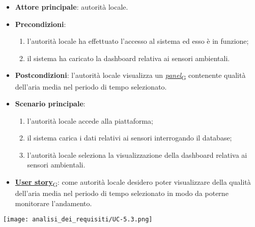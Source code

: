 \begin{itemize}
	\item \textbf{Attore principale}: autorità locale.
	\item \textbf{Precondizioni}:
	      \begin{enumerate}
		      \item l'autorità locale ha effettuato l'accesso al sistema ed esso è in funzione;
		      \item il sistema ha caricato la dashboard relativa ai sensori ambientali.
	      \end{enumerate}
	\item \textbf{Postcondizioni}: l'autorità locale visualizza un \href{https://7last.github.io/docs/rtb/documentazione-interna/glossario\#panel}{\textit{panel}\textsubscript{G}} contenente qualità dell'aria media nel periodo di tempo selezionato.
	\item \textbf{Scenario principale}:
	      \begin{enumerate}
		      \item l'autorità locale accede alla piattaforma;
		      \item il sistema carica i dati relativi ai sensori interrogando il database;
		      \item l'autorità locale seleziona la visualizzazione della dashboard relativa ai sensori ambientali.
	      \end{enumerate}
	\item \href{https://7last.github.io/docs/rtb/documentazione-interna/glossario\#user-story}{\textbf{User story}\textsubscript{G}}: come autorità locale desidero poter visualizzare della qualità dell'aria media nel periodo di tempo selezionato
	      in modo da poterne monitorare l'andamento.
\end{itemize}
\begin{center}
	\texttt{[image: analisi\_dei\_requisiti/UC-5.3.png]}
\end{center}


